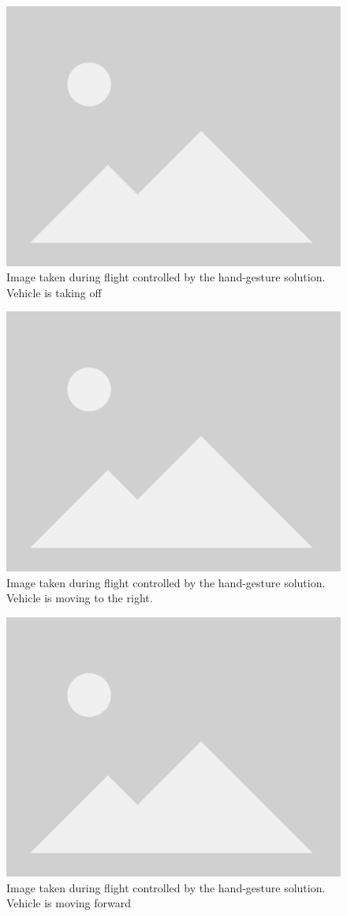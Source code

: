 \begin{figure}
  \centering
  \includegraphics[width=.6\textwidth, keepaspectratio]{img/placeholder.png}
  \caption{Image taken during flight controlled by the hand-gesture solution. Vehicle is taking off}\label{fig:flight-test-hand-takeoff}
\end{figure}

\begin{figure}
  \centering
  \includegraphics[width=.6\textwidth, keepaspectratio]{img/placeholder.png}
  \caption{Image taken during flight controlled by the hand-gesture solution. Vehicle is moving to the right.}\label{fig:flight-test-hand-right}
\end{figure}

\begin{figure}
  \centering
  \includegraphics[width=.6\textwidth, keepaspectratio]{img/placeholder.png}
  \caption{Image taken during flight controlled by the hand-gesture solution. Vehicle is moving forward}\label{fig:flight-test-hand-fwd}
\end{figure}

